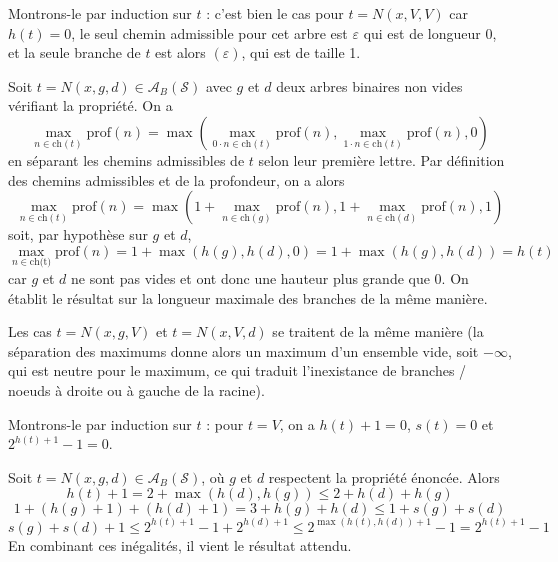\documentclass{scrartcl}
\begin{document}
			\begin{demo}
				\item Montrons-le par induction sur $t$ : c'est bien le cas pour $t = N(x,V,V)$
					car $h(t) = 0$, 
					le seul chemin admissible pour cet arbre est $\varepsilon$ qui est de longueur 0,
					et la seule branche de $t$ est alors $(\varepsilon)$, qui est de taille 1.

				\item Soit $t = N(x,g,d) \in \mathscr{A}_B(\mathcal{S})$ avec $g$ et $d$ deux arbres binaires non vides vérifiant la propriété.
					On a 
					\[
						\max_{n \in \text{ch}(t)} \mathrm{prof}(n) = \max(\max_{0\cdot n \in \text{ch}(t)} \mathrm{prof}(n), \max_{1\cdot n \in \text{ch}(t)} \mathrm{prof}(n), 0)
					\]
					en séparant les chemins admissibles de $t$ selon leur première lettre.
					Par définition des chemins admissibles et de la profondeur, on a alors 
					\[
						\max_{n \in \text{ch}(t)} \mathrm{prof}(n) = \max(1 + \max_{n \in \text{ch}(g)} \mathrm{prof}(n), 1 + \max_{n \in \text{ch}(d)} \mathrm{prof}(n) , 1)
					\]
					soit, par hypothèse sur $g$ et $d$, 
					\[
						\max_{n \in \text{ch(t)}} \mathrm{prof}(n) = 1 + \max(h(g), h(d), 0) = 1 + \max(h(g), h(d)) = h(t)
					\] 
					car $g$ et $d$ ne sont pas vides et ont donc une hauteur plus grande que 0.
					On établit le résultat sur la longueur maximale des branches de la même manière.
				
				\item Les cas $t = N(x,g,V)$ et $t = N(x,V,d)$ se traitent de la même manière (la séparation des maximums donne alors un maximum d'un ensemble vide, soit $- \infty$, qui est neutre pour le maximum, ce qui traduit l'inexistance de branches / noeuds à droite ou à gauche de la racine).
			\end{demo}

			\begin{demo}
				\item Montrons-le par induction sur $t$ : pour $t = V$, on a $h(t) + 1= 0$, $s(t) = 0$ et $2^{h(t)+1}-1 = 0$.
				\item Soit $t = N(x,g,d) \in \mathscr{A}_B(\mathcal{S})$, où $g$ et $d$ respectent la propriété énoncée.
					Alors 
					\[
						h(t) + 1 = 2 + \max(h(d), h(g)) \leq 2 + h(d) + h(g) 
					\]
					\[
						1 + (h(g)+1) + (h(d)+1) = 3 + h(g) + h(d) \leq 1 + s(g) + s(d)
					\]
					\[
						s(g) + s(d) + 1 \leq 2^{h(t) + 1} - 1 + 2^{h(d) + 1} \leq 2^{\max(h(t),h(d)) + 1} - 1 = 2^{h(t)+1}-1
					\]
					En combinant ces inégalités, il vient le résultat attendu.
			\end{demo}
\end{document}
